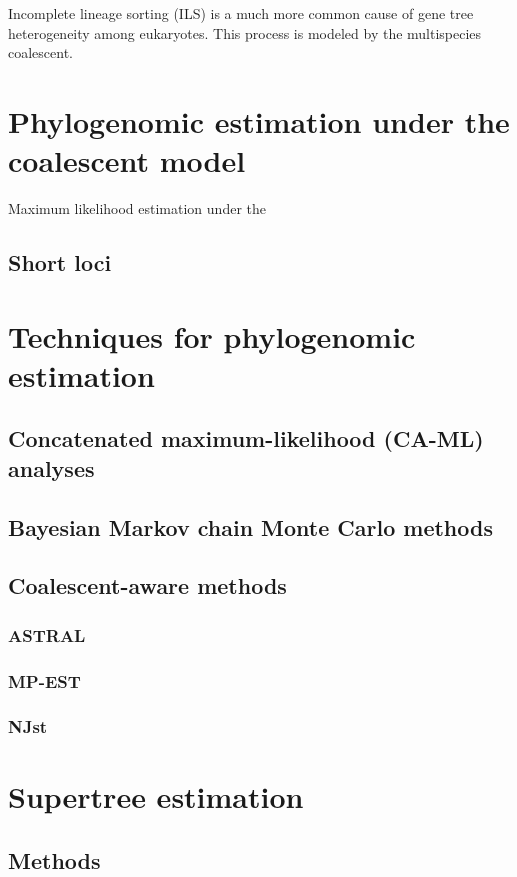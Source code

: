 \documentclass[edeposit,fullpage]{uiucthesis2014}
\theoremstyle{definition}
\begin{document}
Incomplete lineage sorting (ILS) is a much more common cause of gene
tree heterogeneity among eukaryotes. This process is modeled by the
multispecies coalescent. 

\section{Phylogenomic estimation under the coalescent model}

Maximum likelihood estimation under the 

\subsection{Short loci}


\section{Techniques for phylogenomic estimation}

\subsection{Concatenated maximum-likelihood (CA-ML) analyses}
\subsection{Bayesian Markov chain Monte Carlo methods}
\subsection{Coalescent-aware methods}
\subsubsection{ASTRAL}
\subsubsection{MP-EST}
\subsubsection{NJst}

\section{Supertree estimation}
\subsection{Methods}
\end{document}
